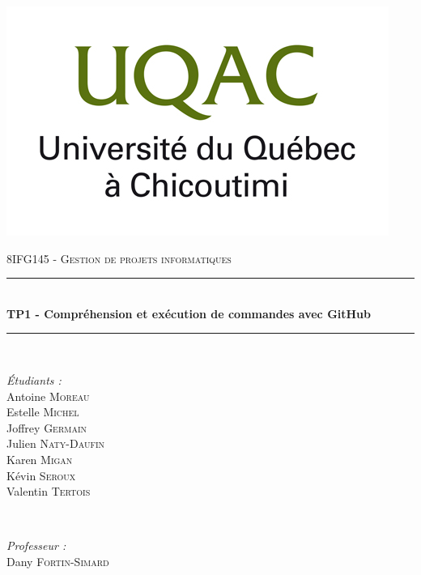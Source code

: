 \documentclass[11pt,canadien]{article}
\begin{document}
\newcommand{\antoine}{Antoine \textsc{Moreau} }
\newcommand{\estelle}{Estelle \textsc{Michel} }
\newcommand{\joffrey}{Joffrey \textsc{Germain} }
\newcommand{\julien}{Julien \textsc{Naty-Daufin} }
\newcommand{\karen}{Karen \textsc{Migan} }
\newcommand{\kevin}{Kévin \textsc{Seroux} }
\newcommand{\valentin}{Valentin \textsc{Tertois} }

\begin{titlepage}

\newcommand{\HRule}{\rule{\linewidth}{0.5mm}} %

\center %
 

\includegraphics[width=\textwidth]{images/uqac_logo.jpg} %
 
\textsc{\LARGE 8IFG145 - Gestion de projets informatiques}\\[0.5cm]


\HRule \\[0.4cm]
{ \huge \bfseries TP1 - Compréhension et exécution de commandes avec GitHub}\\[0.4cm]
\HRule \\[0.5cm]
 

\begin{minipage}{0.4\textwidth}
\begin{flushleft} \large
\emph{Étudiants :}
\\ \antoine
\\ \estelle
\\ \joffrey
\\ \julien
\\ \karen
\\ \kevin
\\ \valentin
\end{flushleft}
\end{minipage}
~
\begin{minipage}{0.4\textwidth}
\begin{flushright} \large
\emph{Professeur :}\\
Dany \textsc{Fortin-Simard}
\end{flushright}
\end{minipage}\\[2cm]


\end{titlepage}
\end{document}
